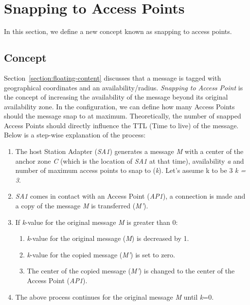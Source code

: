\section{Snapping to Access Points}
In this section, we define a new concept known as snapping to access points.
\subsection{Concept}
Section~\ref{section:floating-content} discusses that a message is tagged with geographical coordinates and an availability/radius. \textit{Snapping to Access Point} is the concept of increasing the availability of the message beyond its original availability zone. In the configuration, we can define how many Access Points should the message snap to at maximum. Theoretically, the number of snapped Access Points should directly influence the TTL (Time to live) of the message. Below is a step-wise explanation of the process:

	\begin{enumerate}
 	 \item The host Station Adapter (\textit{SA1}) generates a message \textit{M} with a center of the anchor zone \textit{C} (which is the location of \textit{SA1} at that time), availability \textit{a} and number of maximum access points to snap to (\textit{k}). Let's assume k to be 3 \textit{k = 3}.
 	 \item \textit{SA1} comes in contact with an Access Point (\textit{AP1}), a connection is made and a copy of the message \textit{M} is transferred (\textit{M'}).
 	 \item If \textit{k}-value for the original message \textit{M} is greater than 0:
 	 	\begin{enumerate}
 	 		\item \textit{k}-value for the original message (\textit{M}) is decreased by 1.
 	 		\item \textit{k}-value for the copied message (\textit{M'}) is set to zero.
 	 		\item The center of the copied message (\textit{M'}) is changed to the center of the Access Point (\textit{AP1}).
 	 	\end{enumerate}
 	 \item The above process continues for the original message \textit{M} until \textit{k}=0.
 	 \end{enumerate}

